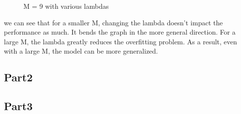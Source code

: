 \begin{figure}[!htb]
  \caption{M = 9 with various lambdas}\label{fig:figures/p3_bishop_m=9}
\endminipage
\end{figure}






we can see that for a smaller M, changing the lambda doesn't impact the performance as much. It bends the graph in the more general direction. For a large M, the lambda greatly reduces the overfitting problem. As a result, even with a large M, the model can be more generalized. 

\subsection{Part2}






\subsection{Part3}
